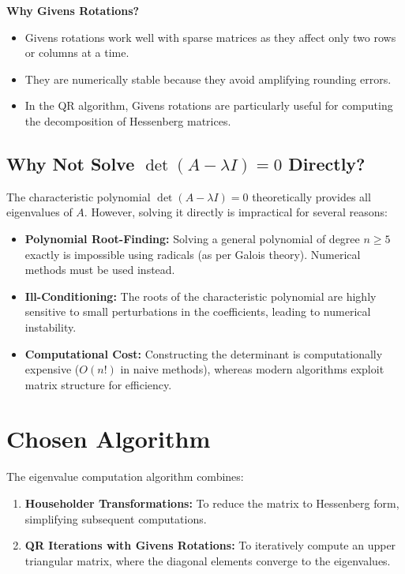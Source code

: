 \documentclass[12pt]{article}
\begin{document}
\textbf{Why Givens Rotations?}
\begin{itemize}
    \item Givens rotations work well with sparse matrices as they affect only two rows or columns at a time.
    \item They are numerically stable because they avoid amplifying rounding errors.
    \item In the QR algorithm, Givens rotations are particularly useful for computing the decomposition of Hessenberg matrices.
\end{itemize}

\subsection*{Why Not Solve \( \det(A - \lambda I) = 0 \) Directly?}
The characteristic polynomial \( \det(A - \lambda I) = 0 \) theoretically provides all eigenvalues of \( A \). However, solving it directly is impractical for several reasons:
\begin{itemize}
    \item \textbf{Polynomial Root-Finding:} Solving a general polynomial of degree \( n \geq 5 \) exactly is impossible using radicals (as per Galois theory). Numerical methods must be used instead.
    \item \textbf{Ill-Conditioning:} The roots of the characteristic polynomial are highly sensitive to small perturbations in the coefficients, leading to numerical instability.
    \item \textbf{Computational Cost:} Constructing the determinant is computationally expensive (\( O(n!) \) in naive methods), whereas modern algorithms exploit matrix structure for efficiency.
\end{itemize}

\section*{Chosen Algorithm}
The eigenvalue computation algorithm combines:
\begin{enumerate}
    \item \textbf{Householder Transformations:} To reduce the matrix to Hessenberg form, simplifying subsequent computations.
    \item \textbf{QR Iterations with Givens Rotations:} To iteratively compute an upper triangular matrix, where the diagonal elements converge to the eigenvalues.
\end{enumerate}
\end{document}
